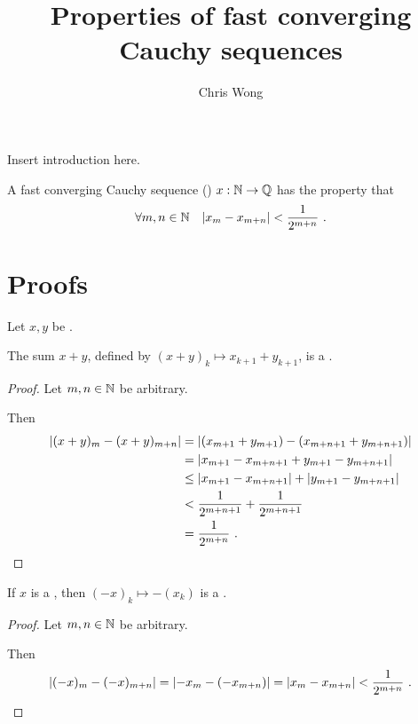 \documentclass[leqno]{report}
\begin{document}
\author{Chris Wong}
\title{Properties of fast converging Cauchy sequences}
\maketitle

Insert introduction here.

\begin{Definition}
    A fast converging Cauchy sequence (\FCCS) $x : \mathbb{N} \rightarrow \mathbb{Q}$ has the property that
    \[ \forall {m, n \in \mathbb{N}} \quad { \left| x_m - x_{m+n} \right| < \frac{1}{2^{m+n}} } \ . \]
\end{Definition}

\section{Proofs}

\begin{Proposition}[Addition]
    \label{add}
    Let $x, y$ be \FCCS.

    The sum $x + y$, defined by $(x+y)_k \mapsto x_{k+1} + y_{k+1}$, is a \FCCS.
\end{Proposition}

\begin{proof}
    Let $m, n \in \mathbb{N}$ be arbitrary.

    Then
    \begin{align*}
        \left| (x+y)_m - (x+y)_{m+n} \right|
        &= \left| (x_{m+1} + y_{m+1}) - (x_{m+n+1} + y_{m+n+1}) \right| \\
        &= \left| x_{m+1} - x_{m+n+1} + y_{m+1} - y_{m+n+1} \right| \\
        &\leq \left| x_{m+1} - x_{m+n+1} \right| + \left| y_{m+1} - y_{m+n+1} \right| \\
        &< \frac{1}{2^{m+n+1}} + \frac{1}{2^{m+n+1}} \\
        &= \frac{1}{2^{m+n}}
        \ . \qedhere
    \end{align*}
\end{proof}

\begin{Proposition}[Negation]
    \label{neg}
    If $x$ is a \FCCS, then $(-x)_k \mapsto -(x_k)$ is a \FCCS.
\end{Proposition}

\begin{proof}
    Let $m, n \in \mathbb{N}$ be arbitrary.

    Then
    \[
        \left| (-x)_m - (-x)_{m+n} \right|
        = \left| -x_m - (-x_{m+n}) \right|
        = \left| x_m - x_{m+n} \right|
        < \frac{1}{2^{m+n}}
        \ . \qedhere
    \]
\end{proof}
\end{document}
